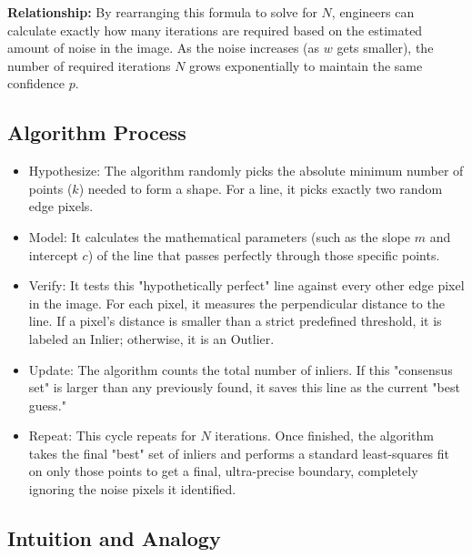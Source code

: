 \documentclass[12pt]{article}
\begin{document}
\textbf{Relationship:} By rearranging this formula to solve for $N$, engineers can calculate exactly how many iterations are required based on the estimated amount of noise in the image. As the noise increases (as $w$ gets smaller), the number of required iterations $N$ grows exponentially to maintain the same confidence $p$.


\subsection{Algorithm Process}

\begin{itemize}
    \item Hypothesize: The algorithm randomly picks the absolute minimum number of points ($k$) needed to form a shape. For a line, it picks exactly two random edge pixels.

    \item Model: It calculates the mathematical parameters (such as the slope $m$ and intercept $c$) of the line that passes perfectly through those specific points.

    \item Verify: It tests this "hypothetically perfect" line against every other edge pixel in the image. For each pixel, it measures the perpendicular distance to the line. If a pixel’s distance is smaller than a strict predefined threshold, it is labeled an Inlier; otherwise, it is an Outlier.

    \item Update: The algorithm counts the total number of inliers. If this "consensus set" is larger than any previously found, it saves this line as the current "best guess."

    \item Repeat: This cycle repeats for $N$ iterations. Once finished, the algorithm takes the final "best" set of inliers and performs a standard least-squares fit on only those points to get a final, ultra-precise boundary, completely ignoring the noise pixels it identified.
\end{itemize}


\subsection{Intuition and Analogy}
\end{document}

